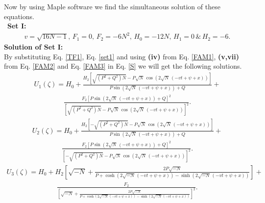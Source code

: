 \documentclass{article}
\numberwithin{equation}{section}
\begin{document}
Now by using Maple software we find the simultaneous solution of these equations.\\\
\textbf{Set I:}
\begin{eqnarray}\label{set1}
v = \sqrt{16 N -1},\,F_{1} = 0,\,F_{2} = -6 N^{2},\, H_{0} = -12 N,\, H_{1} = 0\,{\&}\,H_{2} = -6.
\end{eqnarray}
\textbf{Solution of Set I:}\\
By substituting Eq. \ref{TF1}, Eq. \ref{set1} and using \textbf{(iv)} from Eq. \ref{FAM1}, \textbf{(v,vii)} from Eq. \ref{FAM2} and Eq. \ref{FAM3} in Eq. \ref{S} we will get the following solutions.
\begin{eqnarray}\label{U1}
U_{1} \left(\zeta \right) =H_{0}+\frac{H_{2} \left[\sqrt{\left(P^{2}+Q^{2}\right) N}-P \sqrt{N}\, \cos \! \left(2 \sqrt{N}\, \left(-v t +\psi +x \right)\right)\right]}{P \sin \! \left(2 \sqrt{N}\, \left(-v t +\psi +x \right)\right)+Q}+\nonumber
\end{eqnarray}
\begin{eqnarray}
\frac{F_{2} \left[P \sin \! \left(2 \sqrt{N}\, \left(-v t +\psi +x \right)\right)+Q \right]^{2}}{{\left[\sqrt{\left(P^{2}+Q^{2}\right) N}-P \sqrt{N}\, \cos \! \left(2 \sqrt{N}\, \left(-v t +\psi +x \right)\right)\right]}^{2}}.
\end{eqnarray}
\begin{eqnarray}\label{U2}
U_{2} \left(\zeta \right) =
H_{0}+\frac{H_{2} \left[-\sqrt{\left(P^{2}+Q^{2}\right) N}-P \sqrt{N}\, \cos \! \left(2 \sqrt{N}\, \left(-v t +\psi +x \right)\right)\right]}{P \sin \! \left(2 \sqrt{N}\, \left(-v t +\psi +x \right)\right)+Q}+\nonumber
\end{eqnarray}
\begin{eqnarray}
\frac{F_{2} \left[P \sin \! \left(2 \sqrt{N}\, \left(-v t +\psi +x \right)\right)+Q \right]^{2}}{{\left[-\sqrt{\left(P^{2}+Q^{2}\right) N}-P \sqrt{N}\, \cos \! \left(2 \sqrt{N}\, \left(-v t +\psi +x \right)\right)\right]}^{2}}.
\end{eqnarray}
\begin{eqnarray}\label{U3}
U_{3} \left(\zeta \right) =
H_{0}+H_{2} \left[\sqrt{-N}+\frac{2 P \sqrt{-N}}{P +\cosh \! \left(2 \sqrt{-N}\, \left(-v t +\psi +x \right)\right)-\sinh \! \left(2 \sqrt{-N}\, \left(-v t +\psi +x \right)\right)}\right]+\nonumber
\end{eqnarray}
\begin{eqnarray}
\frac{F_{2}}{\left[\sqrt{-N}+\frac{2 P \sqrt{-N}}{P +\cosh \left(2 \sqrt{-N}\, \left(-v t +\psi +x \right)\right)-\sinh \left(2 \sqrt{-N}\, \left(-v t +\psi +x \right)\right)}\right]^{2}}.
\end{eqnarray}
\end{document}
